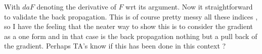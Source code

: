\documentclass[a4paper,10pt]{article}
\begin{document}
With $da F$ denoting the derivative of $F$ wrt its argument.
Now it straightforward to validate the back propagation. This is of course pretty messy all these indices , so I have the feeling that the neater way to show this is to consider the gradient as a one form and in that case is the back propagation nothing but a pull back of the gradient. Perhaps TA's know  if this has been done in this context ?
 
\end{document}
